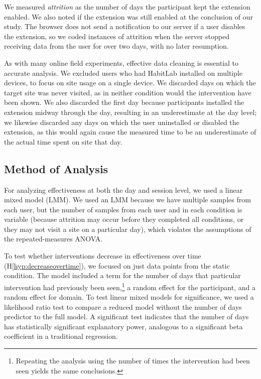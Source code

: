 We measured \textit{attrition} as the number of days the participant kept the extension enabled. We also noted if the extension was still enabled at the conclusion of our study. The browser does not send a notification to our server if a user disables the extension, so we coded instances of attrition when the server stopped receiving data from the user for over two days, with no later resumption.

As with many online field experiments, effective data cleaning is essential to accurate analysis. We excluded users who had HabitLab installed on multiple devices, to focus on site usage on a single device. %
We discarded days on which the target site was never visited, as in neither condition would the intervention have been shown. %
We also discarded the first day because participants installed the extension midway through the day, resulting in an underestimate at the day level; we likewise discarded any days on which the user uninstalled or disabled the extension, as this would again cause the measured time to be an underestimate of the actual time spent on site that day.

\subsection{Method of Analysis}

For analyzing effectiveness at both the day and session level, we used a linear mixed model (LMM). We used an LMM because we have multiple samples from each user, but the number of samples from each user and in each condition is variable (because attrition may occur before they completed all conditions, or they may not visit a site on a particular day), which violates the assumptions of the repeated-measures ANOVA. 


To test whether interventions decrease in effectiveness over time (H\ref*{hyp:decreaseovertime}), we focused on just data points from the static condition. The model included a term for the number of days that particular intervention had previously been seen,\footnote{Repeating the analysis using the number of times the intervention had been seen yields the same conclusions.} a random effect for the participant, and a random effect for domain. To test linear mixed models for significance, we used a likelihood ratio test to compare a reduced model without the number of days predictor to the full model. A significant test indicates that the number of days has statistically significant explanatory power, analogous to a significant beta coefficient in a traditional regression.

